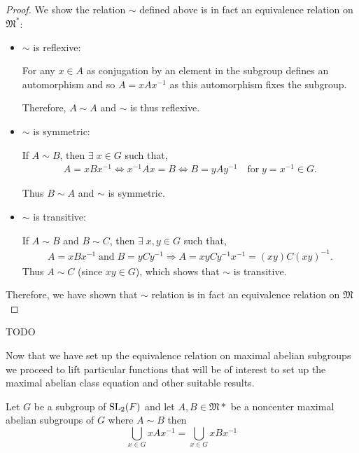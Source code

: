 \begin{proof}
 We show the relation $\sim$ defined above is in fact an equivalence relation on  $\mathfrak{M}^*$:

\begin{itemize}
\item $\sim$ is reflexive:

For any $x \in A$ as conjugation by an element in the subgroup defines an automorphism and so $A = x A x^{-1}$ as this automorphism fixes the subgroup.

Therefore, $A \sim A$ and $\sim$ is thus reflexive.

\item $\sim$ is symmetric:

If $A \sim B$, then $\exists \; x \in G$ such that,
\begin{align*} A = xBx^{-1} \iff x^{-1}Ax = B \iff B = yAy^{-1} \quad \text{for} \; y = x^{-1} \in G.
\end{align*}

Thus $B \sim A$ and $\sim$ is symmetric.\\

\item $\sim$ is transitive:

If $A \sim B$ and $B \sim C$, then $\exists \; x, y \in G$  such that,
\begin{align*} A = xBx^{-1} \; \text{and} \; B = yCy^{-1} \Rightarrow A = xyCy^{-1}x^{-1} = (xy)C(xy)^{-1}.
\end{align*}
Thus $A \sim C$ (since $xy \in G$), which shows that $\sim$ is transitive. \\
\end{itemize}

Therefore, we have shown that $\sim$ relation is in fact an equivalence relation on $\mathfrak{M}$
\end{proof}

\begin{remark}
  TODO
\end{remark}

Now that we have set up the equivalence relation on maximal abelian subgroups we proceed to lift particular functions that will be of interest to set up the maximal abelian class equation and 
other suitable results.

\begin{lemma}
  \label{noncenter_C_eq_of_related}
  Let $G$ be a subgroup of $\operatorname{SL}_2(F)$ and let $A , B \in \mathfrak{M}*$ be a noncenter maximal abelian subgroups of $G$ where $A \sim B$
  then 
  \[
  \bigcup_{x \in G} x A x^{-1} = \bigcup_{x \in G} x B x^{-1}
  \]
\end{lemma}

